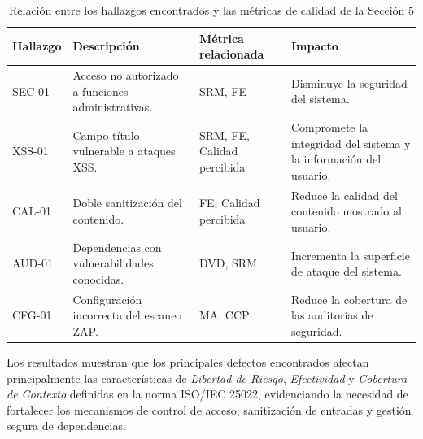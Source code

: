 \begin{table}[H]
    \centering
    \scriptsize
    \begin{tabular}{|p{1.5cm}|p{5cm}|p{4cm}|p{3cm}|}
        \hline
        \textbf{Hallazgo}                                 &
        \textbf{Descripción}                              &
        \textbf{Métrica relacionada}                      &
        \textbf{Impacto}                                                   \\
        \hline

        SEC-01                                            &
        Acceso no autorizado a funciones administrativas. &
        SRM, FE                                           &
        Disminuye la seguridad del sistema.                                \\
        \hline

        XSS-01                                            &
        Campo título vulnerable a ataques XSS.            &
        SRM, FE, Calidad percibida                        &
        Compromete la integridad del sistema y la información del usuario. \\
        \hline

        CAL-01                                            &
        Doble sanitización del contenido.                 &
        FE, Calidad percibida                             &
        Reduce la calidad del contenido mostrado al usuario.               \\
        \hline

        AUD-01                                            &
        Dependencias con vulnerabilidades conocidas.      &
        DVD, SRM                                          &
        Incrementa la superficie de ataque del sistema.                    \\
        \hline

        CFG-01                                            &
        Configuración incorrecta del escaneo ZAP.         &
        MA, CCP                                           &
        Reduce la cobertura de las auditorías de seguridad.                \\
        \hline
    \end{tabular}
    \caption{Relación entre los hallazgos encontrados y las métricas de calidad de la Sección 5}
    \label{tab:metricas}
\end{table}

Los resultados muestran que los principales defectos encontrados afectan principalmente las características de \textit{Libertad de Riesgo}, \textit{Efectividad} y \textit{Cobertura de Contexto} definidas en la norma ISO/IEC 25022, evidenciando la necesidad de fortalecer los mecanismos de control de acceso, sanitización de entradas y gestión segura de dependencias.

